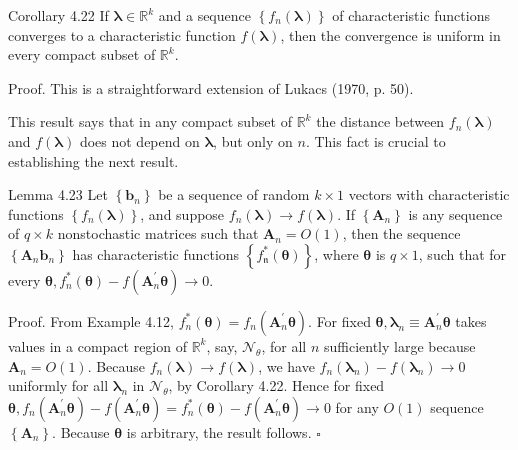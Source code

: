 \documentclass[10pt]{article}
\begin{document}
Corollary 4.22 If $\boldsymbol{\lambda} \in \mathbb{R}^{k}$ and a sequence $\left\{f_{n}(\boldsymbol{\lambda})\right\}$ of characteristic functions converges to a characteristic function $f(\boldsymbol{\lambda})$, then the convergence is uniform in every compact subset of $\mathbb{R}^{k}$.

Proof. This is a straightforward extension of Lukacs (1970, p. 50).

This result says that in any compact subset of $\mathbb{R}^{k}$ the distance between $f_{n}(\boldsymbol{\lambda})$ and $f(\boldsymbol{\lambda})$ does not depend on $\boldsymbol{\lambda}$, but only on $n$. This fact is crucial to establishing the next result.

Lemma 4.23 Let $\left\{\mathbf{b}_{n}\right\}$ be a sequence of random $k \times 1$ vectors with characteristic functions $\left\{f_{n}(\boldsymbol{\lambda})\right\}$, and suppose $f_{n}(\boldsymbol{\lambda}) \rightarrow f(\boldsymbol{\lambda})$. If $\left\{\mathbf{A}_{n}\right\}$ is any sequence of $q \times k$ nonstochastic matrices such that $\mathbf{A}_{n}=O(1)$, then the sequence $\left\{\mathbf{A}_{n} \mathbf{b}_{n}\right\}$ has characteristic functions $\left\{f_{\mathfrak{n}}^{*}(\boldsymbol{\theta})\right\}$, where $\boldsymbol{\theta}$ is $q \times 1$, such that for every $\boldsymbol{\theta}, f_{n}^{*}(\boldsymbol{\theta})-f\left(\mathbf{A}_{n}^{\prime} \boldsymbol{\theta}\right) \rightarrow 0$.

Proof. From Example 4.12, $f_{n}^{*}(\boldsymbol{\theta})=f_{n}\left(\mathbf{A}_{n}^{\prime} \boldsymbol{\theta}\right)$. For fixed $\boldsymbol{\theta}, \boldsymbol{\lambda}_{n} \equiv \mathbf{A}_{n}^{\prime} \boldsymbol{\theta}$ takes values in a compact region of $\mathbb{R}^{k}$, say, $\mathcal{N}_{\theta}$, for all $n$ sufficiently large because $\mathbf{A}_{n}=O(1)$. Because $f_{n}(\boldsymbol{\lambda}) \rightarrow f(\boldsymbol{\lambda})$, we have $f_{n}\left(\boldsymbol{\lambda}_{n}\right)-f\left(\boldsymbol{\lambda}_{n}\right) \rightarrow 0$ uniformly for all $\boldsymbol{\lambda}_{n}$ in $\mathcal{N}_{\theta}$, by Corollary 4.22. Hence for fixed $\boldsymbol{\theta}, f_{n}\left(\mathbf{A}_{n}^{\prime} \boldsymbol{\theta}\right)-f\left(\mathbf{A}_{n}^{\prime} \boldsymbol{\theta}\right)= f_{n}^{*}(\boldsymbol{\theta})-f\left(\mathbf{A}_{n}^{\prime} \boldsymbol{\theta}\right) \rightarrow 0$ for any $O(1)$ sequence $\left\{\mathbf{A}_{n}\right\}$. Because $\boldsymbol{\theta}$ is arbitrary, the result follows. \(\square\)
\end{document}
